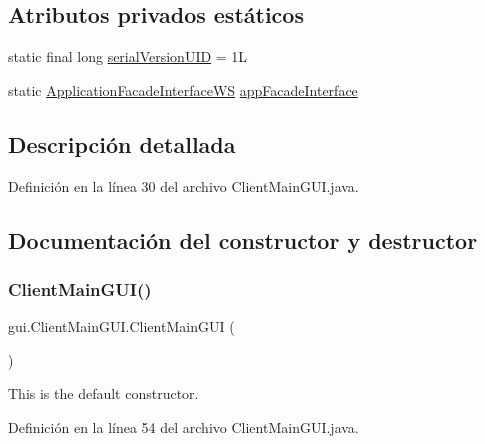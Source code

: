\subsection*{Atributos privados estáticos}
\begin{DoxyCompactItemize}
\item 
static final long \mbox{\hyperlink{classgui_1_1_client_main_g_u_i_ab85e7602a3e65f458b858d0db1640bff}{serial\+Version\+U\+ID}} = 1L
\item 
static \mbox{\hyperlink{interfacebusiness_logic_1_1_application_facade_interface_w_s}{Application\+Facade\+Interface\+WS}} \mbox{\hyperlink{classgui_1_1_client_main_g_u_i_af59bb392168b3018e1f449ea153c09eb}{app\+Facade\+Interface}}
\end{DoxyCompactItemize}


\subsection{Descripción detallada}


Definición en la línea 30 del archivo Client\+Main\+G\+U\+I.\+java.



\subsection{Documentación del constructor y destructor}
\mbox{\label{classgui_1_1_client_main_g_u_i_a29652761456e31647cfa7f9843878a07}} 
\subsubsection{\texorpdfstring{ClientMainGUI()}{ClientMainGUI()}}
{\footnotesize\ttfamily gui.\+Client\+Main\+G\+U\+I.\+Client\+Main\+G\+UI (\begin{DoxyParamCaption}{ }\end{DoxyParamCaption})}



This is the default constructor. 



Definición en la línea 54 del archivo Client\+Main\+G\+U\+I.\+java.


